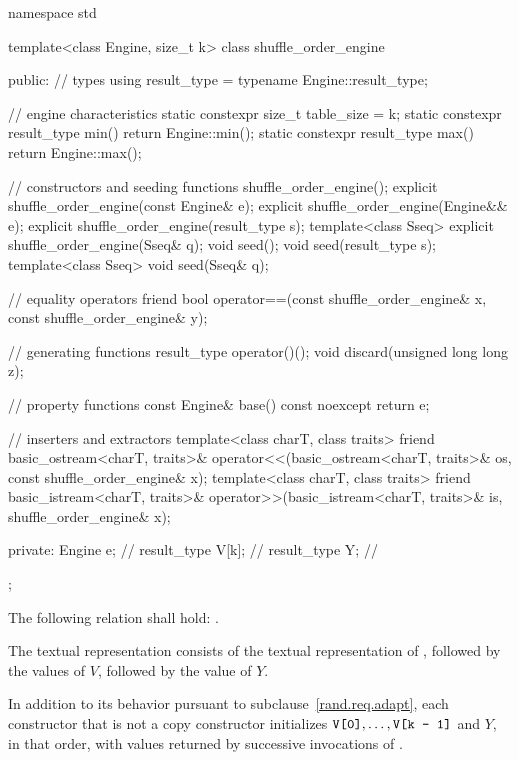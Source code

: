 %
%
\begin{codeblock}
namespace std {
  template<class Engine, size_t k>
  class shuffle_order_engine {
  public:
    // types
    using result_type = typename Engine::result_type;

    // engine characteristics
    static constexpr size_t table_size = k;
    static constexpr result_type min() { return Engine::min(); }
    static constexpr result_type max() { return Engine::max(); }

    // constructors and seeding functions
    shuffle_order_engine();
    explicit shuffle_order_engine(const Engine& e);
    explicit shuffle_order_engine(Engine&& e);
    explicit shuffle_order_engine(result_type s);
    template<class Sseq> explicit shuffle_order_engine(Sseq& q);
    void seed();
    void seed(result_type s);
    template<class Sseq> void seed(Sseq& q);

    // equality operators
    friend bool operator==(const shuffle_order_engine& x, const shuffle_order_engine& y);

    // generating functions
    result_type operator()();
    void discard(unsigned long long z);

    // property functions
    const Engine& base() const noexcept { return e; }

    // inserters and extractors
    template<class charT, class traits>
      friend basic_ostream<charT, traits>&
        operator<<(basic_ostream<charT, traits>& os, const shuffle_order_engine& x);
    template<class charT, class traits>
      friend basic_istream<charT, traits>&
        operator>>(basic_istream<charT, traits>& is, shuffle_order_engine& x);

  private:
    Engine e;           // \expos
    result_type V[k];   // \expos
    result_type Y;      // \expos
  };
}
\end{codeblock}

\pnum
The following relation shall hold:
  .

\pnum
The textual representation
consists of
 the textual representation of ,
followed by
 the  values of $V$,
followed by
 the value of $Y$.

\pnum
In addition to its behavior
pursuant to subclause~\ref{rand.req.adapt},
each constructor%
that is not a copy constructor
initializes $\tcode{V[0]}, \dotsc, \tcode{V[k - 1]}$ and $Y$,
in that order,
with values returned by successive invocations of .%


